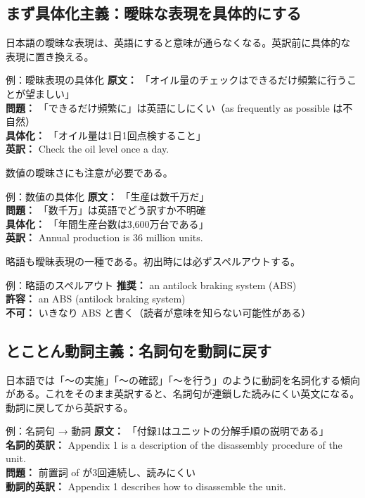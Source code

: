 \subsection{まず具体化主義：曖昧な表現を具体的にする}

日本語の曖昧な表現は、英語にすると意味が通らなくなる。英訳前に具体的な表現に置き換える。

\begin{itembox}[l]{例：曖昧表現の具体化}
\textbf{原文：} 「オイル量のチェックはできるだけ頻繁に行うことが望ましい」\\
\textbf{問題：} 「できるだけ頻繁に」は英語にしにくい（as frequently as possible は不自然）\\
\textbf{具体化：} 「オイル量は1日1回点検すること」\\
\textbf{英訳：} Check the oil level once a day.
\end{itembox}

数値の曖昧さにも注意が必要である。

\begin{itembox}[l]{例：数値の具体化}
\textbf{原文：} 「生産は数千万だ」\\
\textbf{問題：} 「数千万」は英語でどう訳すか不明確\\
\textbf{具体化：} 「年間生産台数は3,600万台である」\\
\textbf{英訳：} Annual production is 36 million units.
\end{itembox}

略語も曖昧表現の一種である。初出時には必ずスペルアウトする。

\begin{itembox}[l]{例：略語のスペルアウト}
\textbf{推奨：} an antilock braking system (ABS)\\
\textbf{許容：} an ABS (antilock braking system)\\
\textbf{不可：} いきなり ABS と書く（読者が意味を知らない可能性がある）
\end{itembox}

\subsection{とことん動詞主義：名詞句を動詞に戻す}

日本語では「〜の実施」「〜の確認」「〜を行う」のように動詞を名詞化する傾向がある。これをそのまま英訳すると、名詞句が連鎖した読みにくい英文になる。動詞に戻してから英訳する。

\begin{itembox}[l]{例：名詞句 → 動詞}
\textbf{原文：} 「付録1はユニットの分解手順の説明である」\\
\textbf{名詞的英訳：} Appendix 1 is a description of the disassembly procedure of the unit.\\
\textbf{問題：} 前置詞 of が3回連続し、読みにくい\\
\textbf{動詞的英訳：} Appendix 1 describes how to disassemble the unit.
\end{itembox}

